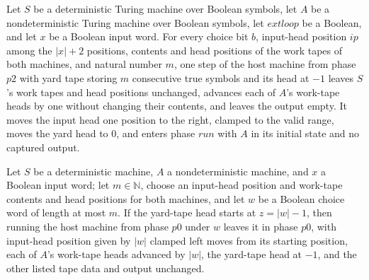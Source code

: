 \begin{theorem}
\label{Turing.ClockHost.p2_turn}
\leanok
{}
Let $S$ be a deterministic Turing machine over Boolean symbols, let $A$ be a
nondeterministic Turing machine over Boolean symbols, let $	ext{loop}$ be a Boolean, and
let $x$ be a Boolean input word. For every choice bit $b$, input-head position $ip$
among the $|x|+2$ positions, contents and head positions of the work tapes of both
machines, and natural number $m$, one step of the host machine from phase $p2$ with yard
tape storing $m$ consecutive true symbols and its head at $-1$ leaves $S$'s work tapes
and head positions unchanged, advances each of $A$'s work-tape heads by one without
changing their contents, and leaves the output empty. It moves the input head one
position to the right, clamped to the valid range, moves the yard head to $0$, and
enters phase $run$ with $A$ in its initial state and no captured output.
\end{theorem}

\begin{theorem}
\label{Turing.ClockHost.p0_marks}
\leanok
{}
Let $S$ be a deterministic machine, $A$ a nondeterministic machine, and $x$ a Boolean
input word; let $m\in\mathbb N$, choose an input-head position and work-tape contents
and head positions for both machines, and let $w$ be a Boolean choice word of length at
most $m$. If the yard-tape head starts at $z=|w|-1$, then running the host machine from
phase $p0$ under $w$ leaves it in phase $p0$, with input-head position given by $|w|$
clamped left moves from its starting position, each of $A$’s work-tape heads advanced by
$|w|$, the yard-tape head at $-1$, and the other listed tape data and output unchanged.
\end{theorem}

